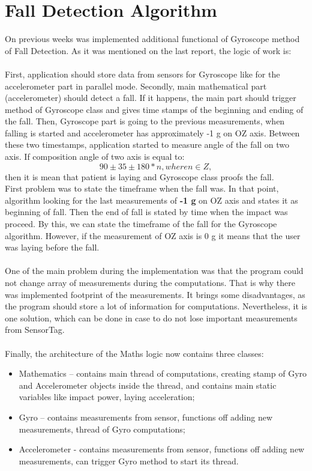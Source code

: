 \documentclass[conference,12pt]{IEEETran}
\begin{document}
\section{Fall Detection Algorithm}
On previous weeks was implemented additional functional of Gyroscope method of Fall Detection. As it was mentioned on the last report, the logic of work is:\\\\
First, application should store data from sensors for Gyroscope like for the accelerometer part in parallel mode. Secondly, main mathematical part (accelerometer) should detect a fall. If it happens, the main part should trigger method of Gyroscope class and gives time stamps of the beginning and ending of the fall. Then, Gyroscope part is going to the previous measurements, when falling is started and accelerometer has approximately -1 g on OZ axis. Between these two timestamps, application started to measure angle of the fall on two axis. If composition angle of two axis is equal to:
$$90 \pm 35 \pm 180*n, where n \in Z,$$
then it is mean that patient is laying and Gyroscope class proofs the fall.\\
First problem was to state the timeframe when the fall was. In that point, algorithm looking for the last measurements of \textbf{-1 g} on OZ axis and states it as beginning of fall. Then the end of fall is stated by time when the impact was proceed. By this, we can state the timeframe of the fall for the Gyroscope algorithm.  However, if the measurement of OZ axis is 0 g it means that the user was laying before the fall.\\\\
One of the main problem during the implementation was that the program could not change array of measurements during the computations. That is why there was implemented footprint of the measurements. It brings some disadvantages, as the program should store a lot of information for computations. Nevertheless, it is one solution, which can be done in case to do not lose important measurements from SensorTag.\\\\
Finally, the architecture of the Maths logic now contains three classes:\\
\begin{itemize}
	\item Mathematics – contains main thread of computations, creating stamp of Gyro and Accelerometer objects inside the thread, and contains main static variables like impact power, laying acceleration;
	\item Gyro – contains measurements from sensor, functions off adding new measurements, thread of Gyro computations;
	\item Accelerometer - contains measurements from sensor, functions off adding new measurements, can trigger Gyro method to start its thread.
\end{itemize}

\printbibliography
\end{document}
